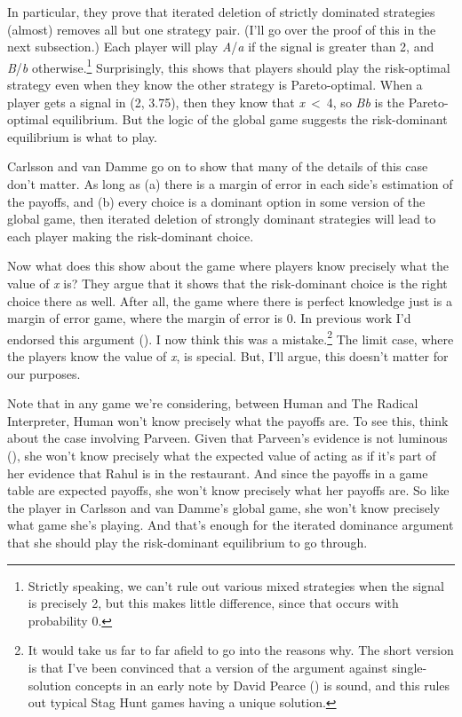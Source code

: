 \documentclass[
  12pt,
  letterpaper,
]{scrbook}
\begin{document}
In particular, they prove that iterated deletion of strictly dominated
strategies (almost) removes all but one strategy pair. (I'll go over the
proof of this in the next subsection.) Each player will play
\emph{A}/\emph{a} if the signal is greater than 2, and \emph{B}/\emph{b}
otherwise.\footnote{Strictly speaking, we can't rule out various mixed
  strategies when the signal is precisely 2, but this makes little
  difference, since that occurs with probability 0.} Surprisingly, this
shows that players should play the risk-optimal strategy even when they
know the other strategy is Pareto-optimal. When a player gets a signal
in (2, 3.75), then they know that \emph{x}~\textless~4, so \emph{Bb} is
the Pareto-optimal equilibrium. But the logic of the global game
suggests the risk-dominant equilibrium is what to play.

Carlsson and van Damme go on to show that many of the details of this
case don't matter. As long as (a) there is a margin of error in each
side's estimation of the payoffs, and (b) every choice is a dominant
option in some version of the global game, then iterated deletion of
strongly dominant strategies will lead to each player making the
risk-dominant choice.

Now what does this show about the game where players know precisely what
the value of \emph{x} is? They argue that it shows that the
risk-dominant choice is the right choice there as well. After all, the
game where there is perfect knowledge just is a margin of error game,
where the margin of error is 0. In previous work I'd endorsed this
argument (). I
now think this was a mistake.\footnote{It would take us far to far
  afield to go into the reasons why. The short version is that I've been
  convinced that a version of the argument against single-solution
  concepts in an early note by David Pearce
  () is sound, and this rules out typical
  Stag Hunt games having a unique solution.} The limit case, where the
players know the value of \emph{x}, is special. But, I'll argue, this
doesn't matter for our purposes.

Note that in any game we're considering, between Human and The Radical
Interpreter, Human won't know precisely what the payoffs are. To see
this, think about the case involving Parveen. Given that Parveen's
evidence is not luminous (), she won't know precisely what the expected value of acting as if
it's part of her evidence that Rahul is in the restaurant. And since the
payoffs in a game table are expected payoffs, she won't know precisely
what her payoffs are. So like the player in Carlsson and van Damme's
global game, she won't know precisely what game she's playing. And
that's enough for the iterated dominance argument that she should play
the risk-dominant equilibrium to go through.
\end{document}
